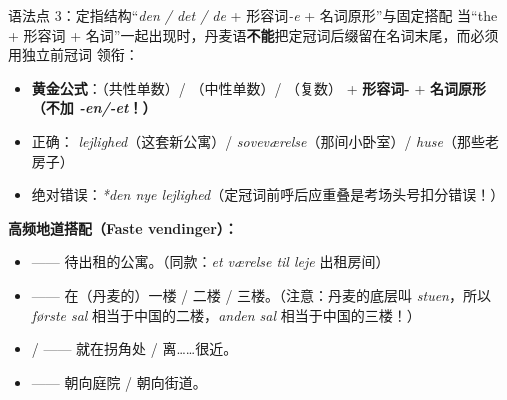 \begin{grammatikbox}{语法点 3：定指结构“\textit{den / det / de} + 形容词\textit{-e} + 名词原形”与固定搭配}
当“the + 形容词 + 名词”一起出现时，丹麦语\textbf{不能}把定冠词后缀留在名词末尾，而必须用独立前冠词  领衔：
\begin{itemize}
  \item \textbf{黄金公式}：（共性单数）/ （中性单数）/ （复数） + \textbf{形容词-} + \textbf{名词原形（不加 \textit{-en/-et}！）}
  \item 正确：\textit{ lejlighed}（这套新公寓）/ \textit{ soveværelse}（那间小卧室）/ \textit{ huse}（那些老房子）
  \item 绝对错误：\textit{*den nye lejlighed}（定冠词前呼后应重叠是考场头号扣分错误！）
\end{itemize}

\textbf{高频地道搭配（Faste vendinger）：}
\begin{itemize}
  \item {} —— 待出租的公寓。（同款：\textit{et værelse til leje} 出租房间）
  \item {} —— 在（丹麦的）一楼 / 二楼 / 三楼。（注意：丹麦的底层叫 \textit{stuen}，所以 \textit{første sal} 相当于中国的二楼，\textit{anden sal} 相当于中国的三楼！）
  \item {} /  —— 就在拐角处 / 离……很近。
  \item {} —— 朝向庭院 / 朝向街道。
\end{itemize}
\end{grammatikbox}


